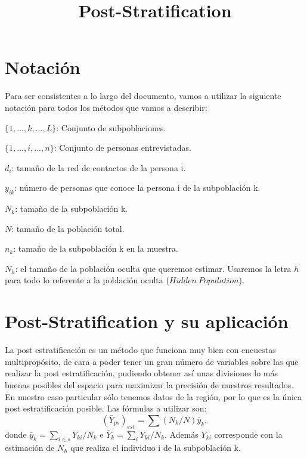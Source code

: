\documentclass{article}
\title{Post-Stratification}
\begin{document}
\maketitle
\section{Notación}
Para ser consistentes a lo largo del documento, vamos a utilizar la siguiente notación para todos los métodos que vamos a describir:
\begin{description}
    \item $\{1,...,k,...,L\}$: Conjunto de subpoblaciones.
    \item$\{1,...,i,...,n\}$: Conjunto de personas entrevistadas.
    \item $d_i$: tamaño de la red de contactos de la persona i.
    \item $y_{ik}$: número de personas que conoce la persona i de la subpoblación k.
    \item $N_k$: tamaño de la subpoblación k.
    \item $N$: tamaño de la población total.
    \item $n_k$: tamaño de la subpoblación k en la muestra.
    \item $N_h$: el tamaño de la población oculta que queremos estimar. Usaremos la letra $h$ para todo lo referente a la población oculta ($Hidden \ Population$).
\end{description}
\section{Post-Stratification y su aplicación}
La post estratificación es un método que funciona muy bien con encuestas multipropósito, de cara a poder tener un gran número de variables sobre las que realizar la post estratificación, pudiendo obtener así unas divisiones lo más buenas posibles del espacio para maximizar la precisión de nuestros resultados. En nuestro caso particular sólo tenemos datos de la región, por lo que es la única post estratificación posible. Las fórmulas a utilizar son:
$$(\bar{Y}_{ps})_{est} = \sum (N_k/N) \bar{y}_k,$$
donde $\bar{y}_k = \sum_{i\in s}Y_{ki}/N_k$ e $\bar{Y}_k = \sum_i Y_{ki}/N_k.$ Además $Y_{ki}$ corresponde con la estimación de $N_h$ que realiza el individuo i de la subpoblación k.
\end{document}
